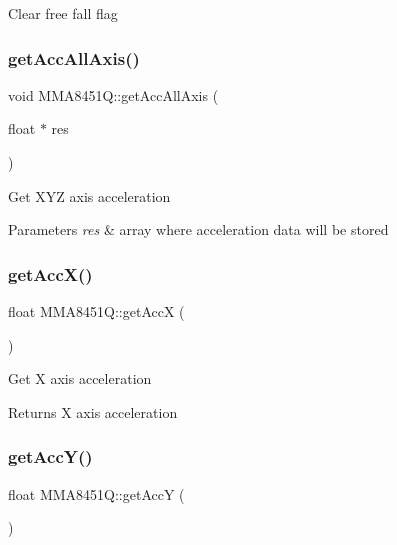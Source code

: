 Clear free fall flag \mbox{\label{classMMA8451Q_a6d7892d095e4f697b6f50ebc3d4b4cfc}} 
\subsubsection{\texorpdfstring{get\+Acc\+All\+Axis()}{getAccAllAxis()}}
{\footnotesize\ttfamily void M\+M\+A8451\+Q\+::get\+Acc\+All\+Axis (\begin{DoxyParamCaption}\item[{float $\ast$}]{res }\end{DoxyParamCaption})}

Get X\+YZ axis acceleration


\begin{DoxyParams}{Parameters}
{\em res} & array where acceleration data will be stored \\
\hline
\end{DoxyParams}
\mbox{\label{classMMA8451Q_a9226a2f00edef47be520ecca28d6a425}} 
\subsubsection{\texorpdfstring{get\+Acc\+X()}{getAccX()}}
{\footnotesize\ttfamily float M\+M\+A8451\+Q\+::get\+AccX (\begin{DoxyParamCaption}{ }\end{DoxyParamCaption})}

Get X axis acceleration

\begin{DoxyReturn}{Returns}
X axis acceleration 
\end{DoxyReturn}
\mbox{\label{classMMA8451Q_a365e88d07f16faa9da4183f34055b4a5}} 
\subsubsection{\texorpdfstring{get\+Acc\+Y()}{getAccY()}}
{\footnotesize\ttfamily float M\+M\+A8451\+Q\+::get\+AccY (\begin{DoxyParamCaption}{ }\end{DoxyParamCaption})}


